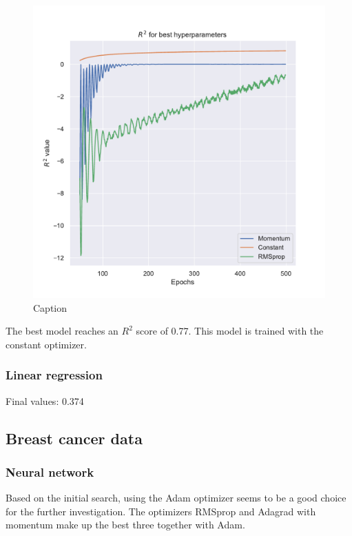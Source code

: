 \begin{figure}[h!]
    \centering
    \includegraphics[width=1.0\linewidth]{project_2/figures/best_continuous.pdf}
    \caption{Caption}
    \label{fig:best_franke}
\end{figure}

The best model reaches an $R^2$ score of 0.77. This model is trained with the constant optimizer. 

\subsubsection{Linear regression}

Final values: 0.374

\subsection{Breast cancer data}

\subsubsection{Neural network}

Based on the initial search, using the Adam optimizer seems to be a good choice for the further investigation. The optimizers RMSprop and Adagrad with momentum make up the best three together with Adam. 

